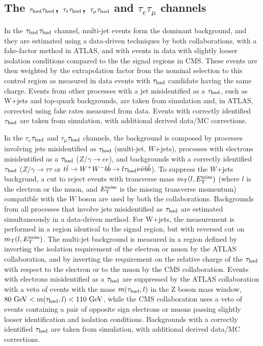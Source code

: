\subsection{The $\tau_{\rm had}\tau_{\rm had}$, $\tau_{e}\tau_{\rm had}$, $\tau_{\mu}\tau_{\rm had}$ and $\tau_{e}\tau_{\mu}$ channels}
In the $\tau_{\rm had}$$\tau_{\rm had}$ channel, multi-jet events form the dominant background, and they are estimated using a data-driven techniques by both collaborations, with a  fake-factor method in ATLAS, and with events in data with slightly looser isolation conditions compared to the the signal regions in CMS. These events are then weighted by the extrapolation factor from the nominal selection to this control region as measured in data events with $\tau_{\rm had}$ candidate having the same charge. Events from other processes with a jet misidentified
as a $\tau_{\rm had}$, such as W+jets and top-quark backgrounds, are taken from simulation and, in ATLAS,
corrected using fake rates measured from data. Events with correctly identified $\tau_{\rm had}$ are taken
from simulation, with additional derived data/MC corrections.


In the $\tau_{e}$$\tau_{\rm had}$ and $\tau_{\mu}$$\tau_{\rm had}$ channels, the background is composed by  processes involving jets misidentified as $\tau_{\rm had}$ (multi-jet, $W$+jets),  processes with electrons misidentified as a $\tau_{\rm had}$ ($Z/\gamma\rightarrow ee$), and backgrounds with a correctly identified $\tau_{\rm had}$ ($Z/\gamma\rightarrow \tau\tau$ or $t\bar{t}\rightarrow W^{+}W^{-}b\bar{b}\rightarrow l \tau_{\rm had}\nu \bar{\nu}b\bar{b}$).
To suppress the $W$+jets backgrund, a cut to reject events with transverse mass $m_{\rm T}(l,E_{\rm T}^{\rm miss})$ (where $l$ is the electron or the muon, and $E_{\rm T}^{\rm miss}$ is the missing transverse momentum) compatible with the $W$ boson are used by both the collaborations.
Backgrounds from all processes that involve jets misidentified as $\tau_{\rm had}$ are estimated simultaneously in a data-driven  method. For W+jets, the measurement is performed in a region identical to the signal region, but with reversed cut on $m_{\rm T}(l, E_{\rm T}^{\rm miss})$. The multi-jet background is measured in a region defined by inverting the isolation requirement of the electron or muon by the ATLAS collaboration, and by inverting the requirement on the relative charge of the $\tau_{\rm had}$ with respect to the electron or to the muon by the CMS collaboration.
Events with electrons misidentified as a $\tau_{\rm had}$ are suppressed by the ATLAS collaboration with a veto of events with the mass $m(\tau_{\rm had},l)$ in the Z boson mass window, $80~{\rm GeV} < m(\tau_{\rm had},l) < 110~{\rm GeV}$, while the CMS collaboration uses a veto of events containing a pair of opposite sign electrons or muons passing slightly looser identification and isolation conditions.
Backgrounds with a correctly identified $\tau_{\rm had}$ are taken from simulation, with additional derived data/MC corrections.

